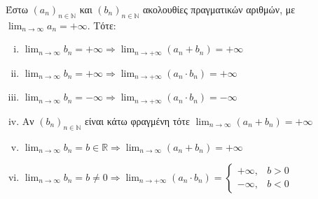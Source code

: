 \begin{mybox3}
  \begin{prop}
    Έστω $ {(a_{n})}_{n \in \mathbb{N}} $ και $ {(b_{n})}_{n \in \mathbb{N}} $ ακολουθίες 
    πραγματικών αριθμών, με $ \lim_{n \to \infty} a_{n}= +\infty $. Τότε:
    \begin{enumerate}[i)]
      \item $ \lim_{n \to \infty} b_{n} = +\infty \Rightarrow \lim_{n \to +\infty}
        (a_{n}+b_{n})= +\infty$
      \item $ \lim_{n \to \infty} b_{n} = +\infty \Rightarrow \lim_{n \to +\infty}
        (a_{n}\cdot b_{n})= +\infty$
      \item $ \lim_{n \to \infty} b_{n} = -\infty \Rightarrow \lim_{n \to +\infty}
        (a_{n}\cdot b_{n})= -\infty$
      \item Αν $ {(b_{n})}_{n \in \mathbb{N}} $ είναι κάτω φραγμένη τότε $ \lim_{n \to
        \infty} (a_{n}+b_{n}) = +\infty $
      \item $ \lim_{n \to \infty} b_{n} = b \in \mathbb{R} 
        \Rightarrow \lim_{n \to \infty} (a_{n}+b_{n})= +\infty$
      \item $ \lim_{n \to \infty} b_{n} = b \neq 0 
        \Rightarrow \lim_{n \to +\infty} (a_{n}\cdot b_{n})= 
        \begin{cases} 
          +\infty, & b >0 \\
          -\infty, & b <0 
        \end{cases} $
    \end{enumerate}
  \end{prop}
\end{mybox3}
